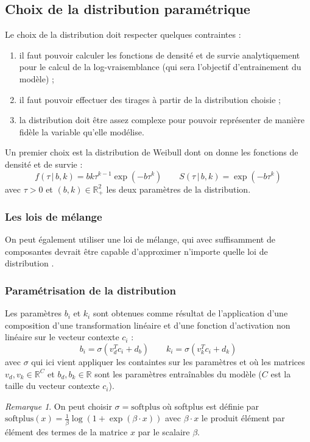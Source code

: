 \documentclass{article}
\theoremstyle{definition}
\theoremstyle{remark}
\newtheorem*{rem}{Remarque}
\begin{document}
\subsection{Choix de la distribution paramétrique}

Le choix de la distribution doit respecter quelques contraintes :
\begin{enumerate}
\item il faut pouvoir calculer les fonctions de densité et de survie
analytiquement pour le calcul de la log-vraisemblance (qui sera l'objectif
d'entrainement du modèle) ;
\item il faut pouvoir effectuer des tirages à partir de la distribution
choisie ;
\item la distribution doit être assez complexe pour pouvoir représenter
de manière fidèle la variable qu'elle modélise.
\end{enumerate}

Un premier choix est la distribution de Weibull dont on donne les
fonctions de densité et de survie :
$$f(\tau \, |\,  b, k) = bk\tau^{k-1}\exp(-b\tau^k)
\quad \quad
S(\tau \, |\,  b, k) = \exp(-b\tau^k)$$
avec $\tau > 0$ et $(b, k) \in \mathbb{R}^2_+$ les deux paramètres de la
distribution.

\subsubsection{Les lois de mélange}

On peut également utiliser une loi de mélange, qui avec suffisamment de
composantes devrait être capable d'approximer n'importe quelle loi de
distribution \cite{shchur2022thesis}.

\subsubsection{Paramétrisation de la distribution}

Les paramètres $b_i$ et $k_i$ sont obtenues comme résultat 
de l'application d'une composition
d'une transformation linéaire et d'une fonction d'activation non linéaire
sur le vecteur contexte $c_i$ :
$$b_i = \sigma(v_d^T c_i + d_b) \quad \quad k_i = \sigma(v_k^T c_i + d_k)$$
avec $\sigma$ qui ici vient appliquer les containtes sur les paramètres
et où les matrices $v_d, v_k \in \mathbb{R}^C$ et $b_d, b_k \in \mathbb{R}$
sont les paramètres entraînables du modèle ($C$ est la taille du vecteur
contexte $c_i$).

\begin{rem}
On peut choisir $\sigma = \text{softplus}$ où softplus est définie par
$\text{softplus}(x) = \frac{1}{\beta} \log(1 + \exp(\beta \cdot x))$ avec
$\beta \cdot x$ le produit élément par élément des termes de la matrice $x$
par le scalaire $\beta$.
\end{rem}
\end{document}

